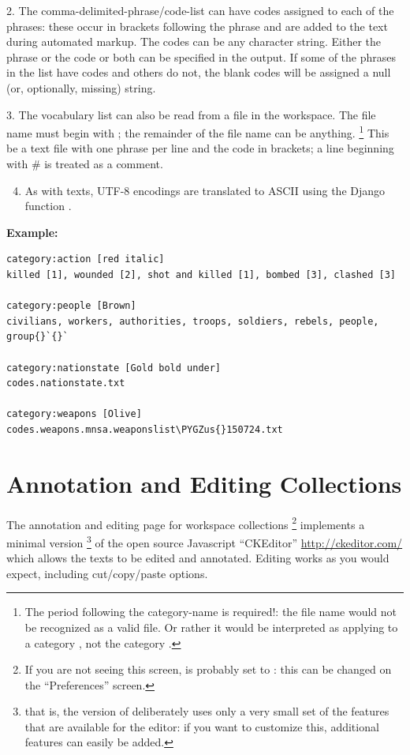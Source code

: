 \documentclass[letterpaper,10pt,english]{sphinxmanual}
\def\PYGZus{\char`\_}
\begin{document}
2. The comma-delimited-phrase/code-list can have codes assigned to each of
the phrases: these occur in brackets following the phrase and are added
to the text during automated markup. The codes can be any character
string. Either the phrase or the code or both can be specified in the
output. If some of the phrases in the list have codes and others do not,
the blank codes will be assigned a null (or, optionally, missing)
string.

3. The vocabulary list can also be read from a file in the workspace. The
file name must begin with ; the remainder of
the file name can be anything. \footnote{
The period following the category-name is required!: the file name
 would not be recognized as a valid
 file. Or rather it would be interpreted as applying to a
category , not the category .
} This be a text file with one phrase
per line and the code in brackets; a line beginning with \# is treated as
a comment.
\begin{enumerate}
\setcounter{enumi}{3}
\item {} 
As with texts, UTF-8 encodings are translated to ASCII using the
Django function .

\end{enumerate}

\textbf{Example:}

\begin{Verbatim}[commandchars=\\\{\}]
category:action [red italic]
killed [1], wounded [2], shot and killed [1], bombed [3], clashed [3]

category:people [Brown]
civilians, workers, authorities, troops, soldiers, rebels, people, group{}`{}`

category:nationstate [Gold bold under]
codes.nationstate.txt

category:weapons [Olive]
codes.weapons.mnsa.weaponslist\PYGZus{}150724.txt
\end{Verbatim}


\chapter{Annotation and Editing Collections}
\label{annotation::doc}\label{annotation:annotation-and-editing-collections}
The annotation and editing page for workspace collections \footnote{
If you are not seeing this screen,   is
probably set to : this can be changed on the “Preferences”
screen.
} implements a
minimal version \footnote{
that is, the version of  deliberately uses only a very
small set of the features that are available for the editor: if you
want to customize this, additional features can easily be added.
} of the open source Javascript “CKEditor” \href{http://ckeditor.com/}{http://ckeditor.com/} which allows the
texts to be edited and annotated. Editing works as you would expect,
including cut/copy/paste options.
\end{document}
